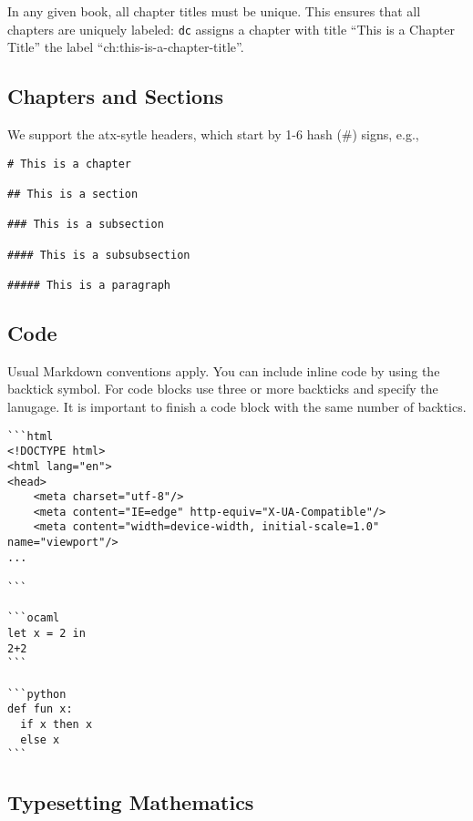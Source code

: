 \begin{important}
In any given book, all chapter titles must be unique.  
%
This ensures that all chapters are uniquely labeled: \lstinline`dc` assigns a chapter with title ``This is a Chapter Title'' the label ``ch:this-is-a-chapter-title''.
\end{important}


\subsection{Chapters and Sections}

We support the atx-sytle headers, which start by 1-6 hash (\#) signs, e.g.,
\begin{lstlisting}
# This is a chapter

## This is a section

### This is a subsection

#### This is a subsubsection

##### This is a paragraph
\end{lstlisting}



\subsection{Code}
\label{sec:dc::md::code}

Usual Markdown conventions apply.  You can include inline code by using the backtick symbol. For code blocks use three or more backticks and specify the lanugage. It is important to finish a code block with the same number of backtics.

\begin{example}
\begin{lstlisting}
```html
<!DOCTYPE html>
<html lang="en">
<head>
    <meta charset="utf-8"/>
    <meta content="IE=edge" http-equiv="X-UA-Compatible"/>
    <meta content="width=device-width, initial-scale=1.0" name="viewport"/>
...

```

```ocaml
let x = 2 in
2+2
```

```python
def fun x:
  if x then x
  else x
```
\end{lstlisting}
\end{example} 

\subsection{Typesetting Mathematics}


